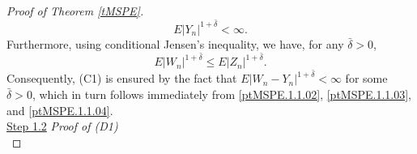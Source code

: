 \documentclass[ejsv2]{imsart}
\theoremstyle{plain}
\theoremstyle{definition}
\theoremstyle{remark}
\begin{document}
\begin{proof}[Proof of Theorem \ref{tMSPE}]
{\begin{equation}\label{ptMSPE.1.1.03}
E|Y_n|^{1+\bar{\delta}}<\infty.
\end{equation}
Furthermore, using conditional Jensen's inequality, we have, for any $\bar{\delta}>0$,
\begin{equation}\label{ptMSPE.1.1.04}
E|W_n|^{1+\bar{\delta}}\leq E|Z_n|^{1+\bar{\delta}}.
\end{equation}
Consequently, (C1) is ensured by the fact that 
$E|W_n-Y_n|^{1+\bar{\delta}}<\infty$ for some $\bar{\delta}>0$, which in turn
follows immediately from
\eqref{ptMSPE.1.1.02}, \eqref{ptMSPE.1.1.03}, and \eqref{ptMSPE.1.1.04}.\\

\noindent\noindent
\underline{Step 1.2} \textit{Proof of {\rm (D1)}}\\

}
\end{proof}
\end{document}
